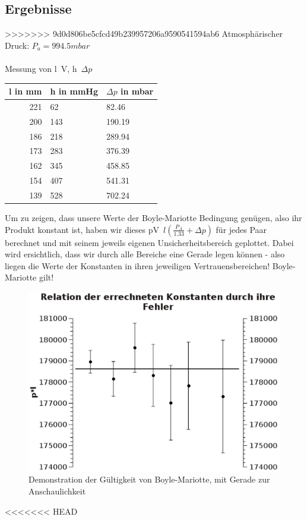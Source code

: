 \documentclass{article}
\begin{document}
\subsection{Ergebnisse}
>>>>>>> 9d0d806be5cfcd49b239957206a9590541594ab6
Atmosphärischer Druck: $P_a=994.5mbar$\\
\\
Messung von l~V, h~$\Delta p$
\begin{center}
\begin{tabular}{r|l|l}
l in mm & h in mmHg & $\Delta p$ in mbar\\
\hline
221 & 62 & 82.46\\
200 & 143 & 190.19\\
186 & 218 & 289.94\\
173 & 283 & 376.39\\
162 & 345 & 458.85\\
154 & 407 & 541.31\\
139 & 528 & 702.24\\
\end{tabular}
\end{center}
Um zu zeigen, dass unsere Werte der Boyle-Mariotte Bedingung genügen, also ihr Produkt konstant ist, haben wir dieses pV~$l(\frac{P_A}{1.33}+\Delta p)$ für jedes Paar berechnet und mit seinem jeweils eigenen Unsicherheitsbereich geplottet. Dabei wird ersichtlich, dass wir durch alle Bereiche eine Gerade legen können - also liegen die Werte der Konstanten in ihren jeweiligen Vertrauensbereichen! Boyle-Mariotte gilt!\\
\begin{center}
\begin{figure}
\caption{Demonstration der Gültigkeit von Boyle-Mariotte, mit Gerade zur Anschaulichkeit}
\includegraphics[scale=0.7]{Graph1.eps}
\end{figure}
\end{center}
<<<<<<< HEAD
\end{document}
